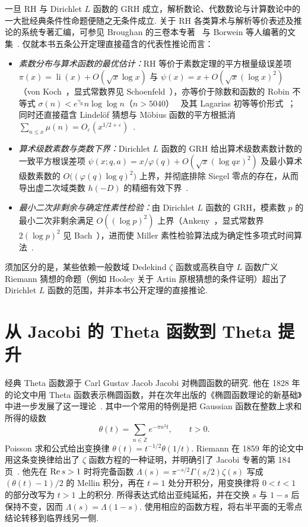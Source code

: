 一旦 RH 与 Dirichlet $L$ 函数的 GRH 成立，解析数论、代数数论与计算数论中的一大批经典条件性命题便随之无条件成立. 关于 RH 各类算术与解析等价表述及推论的系统专著汇编，可参见 Broughan 的三卷本专著~\cite{Broughan2017a,Broughan2017b,Broughan2023} 与 Borwein 等人编著的文集~\cite{BorweinEtAl2008}. 仅就本书五条公开定理直接蕴含的代表性推论而言：
\begin{itemize}
\item \emph{素数分布与算术函数的最优估计：}RH 等价于素数定理的平方根量级误差项 $\pi(x)=\operatorname{li}(x)+O(\sqrt{x}\log x)$ 与 $\psi(x)=x+O(\sqrt{x}(\log x)^2)$（von Koch~\cite{vonKoch1901}，显式常数界见 Schoenfeld~\cite{Schoenfeld1976}），亦等价于除数和函数的 Robin 不等式 $\sigma(n)<e^{\gamma_{\mathrm E}}n\log\log n$（$n>5040$）~\cite{Robin1984} 及其 Lagarias 初等等价形式~\cite{Lagarias2002}；同时还直接蕴含 Lindelöf 猜想与 Möbius 函数的平方根抵消 $\sum_{n\le x}\mu(n)=O_\varepsilon(x^{1/2+\varepsilon})$~\cite{Titchmarsh1986,IwaniecKowalski2004}.
\item \emph{算术级数素数与类数下界：}Dirichlet $L$ 函数的 GRH 给出算术级数素数计数的一致平方根误差项 $\psi(x;q,a)=x/\varphi(q)+O(\sqrt{x}(\log qx)^2)$ 及最小算术级数素数的 $O\bigl((\varphi(q)\log q)^2\bigr)$ 上界，并彻底排除 Siegel 零点的存在，从而导出虚二次域类数 $h(-D)$ 的精细有效下界~\cite{Davenport2000,IwaniecKowalski2004,MontgomeryVaughan2007}.
\item \emph{最小二次非剩余与确定性素性检验：}由 Dirichlet $L$ 函数的 GRH，模素数 $p$ 的最小二次非剩余满足 $O((\log p)^2)$ 上界（Ankeny~\cite{Ankeny1952}，显式常数界 $2(\log p)^2$ 见 Bach~\cite{Bach1990}），进而使 Miller 素性检验算法成为确定性多项式时间算法~\cite{Miller1976,Bach1990}.
\end{itemize}
须加区分的是，某些依赖一般数域 Dedekind $\zeta$ 函数或高秩自守 $L$ 函数广义 Riemann 猜想的命题（例如 Hooley 关于 Artin 原根猜想的条件证明）超出了 Dirichlet $L$ 函数的范围，并非本书公开定理的直接推论.

\section*{从 Jacobi 的 Theta 函数到 Theta 提升}

经典 Theta 函数源于 Carl Gustav Jacob Jacobi 对椭圆函数的研究. 他在 1828 年的论文中用 Theta 函数表示椭圆函数，并在次年出版的《椭圆函数理论的新基础》中进一步发展了这一理论~\cite{Jacobi1828,Jacobi1829}. 其中一个常用的特例是把 Gaussian 函数在整数上求和所得的级数
\[
  \theta(t)=\sum_{n\in\mathbb Z} e^{-\pi n^2t},
  \qquad t>0.
\]
Poisson 求和公式给出变换律 $\theta(t)=t^{-1/2}\theta(1/t)$. Riemann 在 1859 年的论文中用这条变换律给出了 $\zeta$ 函数方程的一种证明，并明确引了 Jacobi 专著的第 184 页~\cite{Riemann1859,Jacobi1829}. 他先在 $\operatorname{Re} s>1$ 时将完备函数 $\Lambda(s)=\pi^{-s/2}\Gamma(s/2)\zeta(s)$ 写成 $(\theta(t)-1)/2$ 的 Mellin 积分，再在 $t=1$ 处分开积分，用变换律将 $0<t<1$ 的部分改写为 $t>1$ 上的积分. 所得表达式给出亚纯延拓，并在交换 $s$ 与 $1-s$ 后保持不变，因而 $\Lambda(s)=\Lambda(1-s)$. 使用相应的函数方程，将右半平面的无零点结论转移到临界线另一侧.

